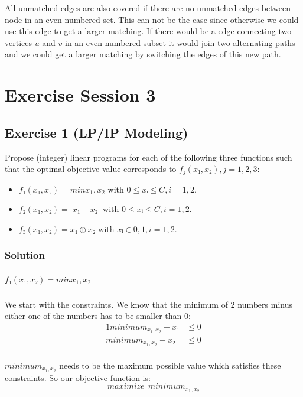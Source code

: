 \documentclass[a4paper, 12pt]{report}
\begin{document}
All unmatched edges are also covered if there are no unmatched edges between
node in an even numbered set. This can not be the case since otherwise we could
use this edge to get a larger matching. If there would be a edge connecting two
vertices $u$ and $v$ in an even numbered subset it would join two alternating
paths and we could get a larger matching by switching the edges of this new
path.

\chapter{Exercise Session 3}

\section{Exercise 1 (LP/IP Modeling)}

Propose (integer) linear programs for each of the following three functions
such that the optimal objective value corresponds to $f_j(x₁,x₂), j = 1,2,3$:

\begin{itemize}
    \item $f₁(x₁, x₂) = min{x_1,x_2}$ with $0 ≤ xᵢ ≤ C, i = 1,2$.
    \item $f₂(x₁, x₂) = |x₁ − x₂|$ with $0 ≤ xᵢ ≤ C, i = 1, 2$.
    \item $f₃(x₁, x₂) = x₁ ⊕ x₂$ with $xᵢ ∈ {0, 1}, i = 1, 2$.
\end{itemize}

\subsection{Solution}

\paragraph{$f₁(x₁, x₂) = min{x_1,x_2}$}

We start with the constraints. We know that the minimum of 2 numbers minus
either one of the numbers has to be smaller than 0:
\begin{alignat*}{1}
    minimum_{x_1,x_2} - x₁ &≤ 0\\
    minimum_{x_1,x_2} - x₂ &≤ 0\\
\end{alignat*}

$minimum_{x_1,x_2}$ needs to be the maximum possible value which satisfies these
constraints. So our objective function is:
\[
    maximize ~~ minimum_{x_1,x_2}
\]
\end{document}
